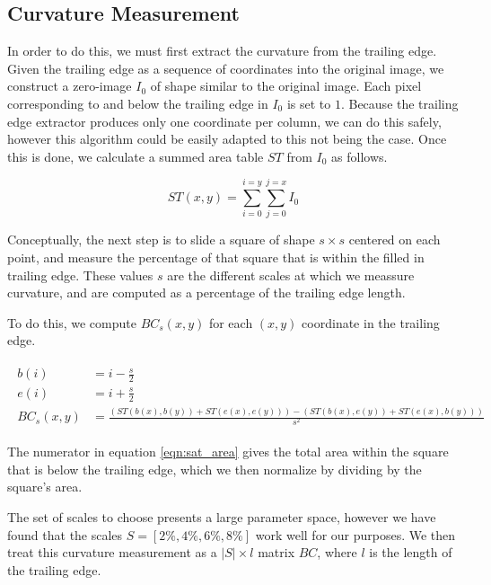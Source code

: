 \subsection{Curvature Measurement}

In order to do this, we must first extract the curvature from the trailing edge.
Given the trailing edge as a sequence of coordinates into the original image, we construct a zero-image $I_0$ of shape similar to the original image.
Each pixel corresponding to and below the trailing edge in $I_0$ is set to $1$.
Because the trailing edge extractor produces only one coordinate per column, we can do this safely, however this algorithm could be easily adapted to this not being the case.
Once this is done, we calculate a summed area table \cite{crow1984summed} $ST$ from $I_0$ as follows.

\begin{equation} \label{eqn:sat}
ST(x,y) = \sum_{i=0}^{i=y}\sum_{j=0}^{j=x} I_0 
\end{equation}

Conceptually, the next step is to slide a square of shape $s \times s$ centered on each point, and measure the percentage of that square that is within the filled in trailing edge.
These values $s$ are the different scales at which we meassure curvature, and are computed as a percentage of the trailing edge length.

To do this, we compute $BC_s(x, y)$ for each $(x, y)$ coordinate in the trailing edge.

\begin{align} \label{eqn:sat_area}
\begin{split}
b(i) &= i - \frac{s}{2}\\
e(i) &= i + \frac{s}{2}\\
BC_s(x,y) &= \frac{(ST(b(x), b(y)) + ST(e(x), e(y))) - (ST(b(x), e(y)) + ST(e(x), b(y)))}{s^2}
\end{split}
\end{align}

The numerator in equation \eqref{eqn:sat_area} gives the total area within the square that is below the trailing edge, which we then normalize by dividing by the square's area.

The set of scales to choose presents a large parameter space, however we have found that the scales $S = [2\%, 4\%, 6\%, 8\%]$ work well for our purposes.
We then treat this curvature measurement as a $|S| \times l$ matrix $BC$, where $l$ is the length of the trailing edge.

